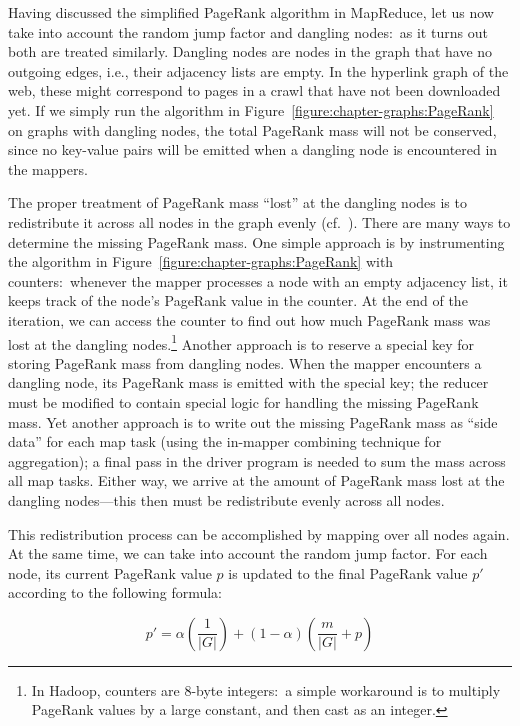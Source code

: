 Having discussed the simplified PageRank algorithm in MapReduce, let
us now take into account the random jump factor and dangling
nodes:\ as it turns out both are treated similarly.  Dangling nodes
are nodes in the graph that have no outgoing edges, i.e., their
adjacency lists are empty.  In the hyperlink graph of the web, these
might correspond to pages in a crawl that have not been downloaded
yet.  If we simply run the algorithm in
Figure~\ref{figure:chapter-graphs:PageRank} on graphs with dangling nodes,
the total PageRank mass will not be conserved, since no key-value
pairs will be emitted when a dangling node is encountered in the
mappers.

The proper treatment of PageRank mass ``lost'' at the dangling nodes
is to redistribute it across all nodes in the graph evenly
(cf.~\cite{Bianchini_etal_2005}).  There are many ways to determine
the missing PageRank mass.  One simple approach is by instrumenting
the algorithm in Figure~\ref{figure:chapter-graphs:PageRank} with
counters:\ whenever the mapper processes a node with an empty
adjacency list, it keeps track of the node's PageRank value in the
counter.  At the end of the iteration, we can access the counter to
find out how much PageRank mass was lost at the dangling
nodes.\footnote{In Hadoop, counters are 8-byte integers:\ a simple
  workaround is to multiply PageRank values by a large constant, and
  then cast as an integer.}  Another approach is to reserve a special
key for storing PageRank mass from dangling nodes.  When the mapper
encounters a dangling node, its PageRank mass is emitted with the
special key; the reducer must be modified to contain special logic for
handling the missing PageRank mass.  Yet another approach is to write
out the missing PageRank mass as ``side data'' for each map task
(using the in-mapper combining technique for aggregation); a final
pass in the driver program is needed to sum the mass across all map
tasks.  Either way, we arrive at the amount of PageRank mass lost at
the dangling nodes---this then must be redistribute evenly across all
nodes.

This redistribution process can be accomplished by mapping over all
nodes again.  At the same time, we can take into account the random
jump factor.  For each node, its current PageRank value $p$ is updated
to the final PageRank value $p'$ according to the following formula:

\begin{equation}
p' = \alpha \left( \frac{1}{|G|} \right) + \left( 1-\alpha \right) \left( \frac{m}{|G|} + p \right)
\end{equation}

